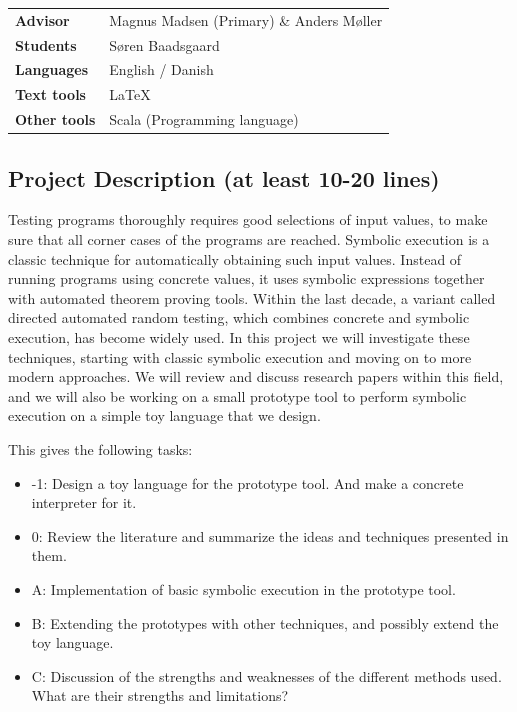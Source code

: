 \documentclass{article}
\begin{document}
\pagestyle{fancy}

\bgroup{}
\begin{table}[h]
\begin{tabular}{ll}
\textbf{Advisor}     & Magnus Madsen (Primary) \& Anders Møller    \\
\textbf{Students}    & Søren Baadsgaard \\
\textbf{Languages}   & English / Danish \\
\textbf{Text tools}  & \LaTeX         \\
\textbf{Other tools} & Scala (Programming language)         
\end{tabular}
\end{table}
\egroup\vspace{-0.cm}

\subsection*{Project Description (at least 10-20 lines)}
Testing programs thoroughly requires good selections of input values, to make sure that all corner 
cases of the programs are reached. Symbolic execution is a classic technique for automatically 
obtaining such input values. Instead of running programs using
concrete values, it uses symbolic 
expressions together with automated theorem proving tools. Within the last decade, a variant 
called directed automated random testing, which combines concrete and symbolic execution, has 
become widely used. In this project we will investigate these techniques, starting with classic symbolic execution and moving on to more modern approaches. We will review and discuss research papers within this field, and we will also be working on a small prototype tool to perform symbolic execution on a simple toy language that we design. 

This gives the following tasks:

\begin{itemize}
	\item -1: Design a toy language for the prototype tool. And make a concrete interpreter for it. 
	\item 0: Review the literature and summarize the ideas and techniques presented in them.
	\item A: Implementation of basic symbolic execution in the prototype tool.
	\item B: Extending the prototypes with other techniques, and possibly extend the toy language.
	\item C: Discussion of the strengths and weaknesses of the different methods used. What are their strengths and limitations? 
\end{itemize}
\end{document}
